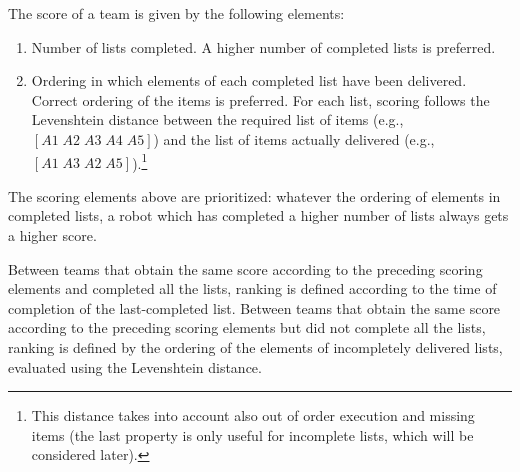 The score of a team is given by the following elements:
%
\begin{enumerate}
\item Number of lists completed. A higher number of completed lists is preferred.
\item Ordering in which elements of each completed list have been delivered. Correct ordering of the items is preferred. For each list, scoring follows the Levenshtein distance between the required list of items (e.g., $\left[A1\;A2\;A3\;A4\;A5\right]$) and the list of items actually delivered (e.g., $\left[A1\;A3\;A2\;A5\right]$).\footnote{This distance takes into account also out of order execution and missing items (the last property is only useful for incomplete lists, which will be considered later).}
\end{enumerate}
%
The scoring elements above are prioritized: whatever the ordering of elements in completed lists, a robot which has completed a higher number of lists always gets a higher score. %

Between teams that obtain the same score according to the preceding scoring elements and completed all the lists, ranking is defined according to the time of completion of the last-completed list.
Between teams that obtain the same score according to the preceding scoring elements but did not complete all the lists, ranking is defined by the ordering of the elements of incompletely delivered lists, evaluated using the Levenshtein distance.


